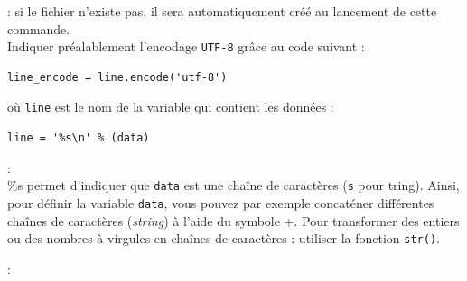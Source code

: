\documentclass[11pt]{article}
\begin{document}
\begin{enumerate}
\underline{}: si le fichier n'existe pas, il sera automatiquement créé au lancement de cette commande. \\



Indiquer préalablement l'encodage \texttt{UTF-8} grâce au code suivant : 
\vspace*{-1em}
\begin{center}
\begin{minipage}[t]{0.4\textwidth}
\begin{verbatim}
line_encode = line.encode('utf-8')
\end{verbatim}
\end{minipage}
\end{center}
\vspace*{1em}

où \og{}\texttt{line}\fg{} est le nom de la variable qui contient les données :
\vspace*{-1em}
\begin{center}
\begin{minipage}[t]{0.264\textwidth}
\begin{verbatim}
line = '%s\n' % (data)
\end{verbatim}
\end{minipage}
\end{center}










\newpage{}
\underline{}:\\
\vspace{0.2em}
\og{}\%s\fg{} permet d'indiquer que \og{}\texttt{data}\fg{} est une chaîne de caractères (\texttt{s} pour \underline{}tring). Ainsi, pour définir la variable \og{}\texttt{data}\fg{}, vous pouvez par exemple concaténer différentes chaînes de caractères (\emph{string}) à l'aide du symbole \og{}+\fg{}. Pour transformer des entiers ou des nombres à virgules en chaînes de caractères : utiliser la fonction \texttt{str()}.

\vspace{0.64em}
\hspace*{2em}
\begin{minipage}[t]{0.88\textwidth}
\underline{}:


\end{minipage}
\end{enumerate}
\end{document}
